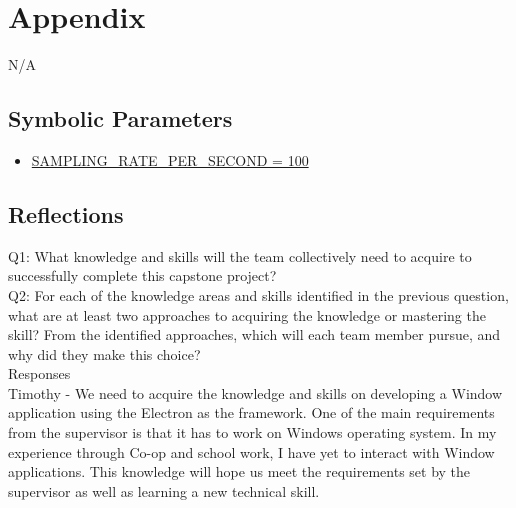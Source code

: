 \documentclass[12pt, titlepage]{article}
\begin{document}




\newpage

\section{Appendix}

N/A

\subsection{Symbolic Parameters}

\begin{itemize}
    \color{red}
    \item \hyperref[sec:sampling]{SAMPLING\_RATE\_PER\_SECOND = 100}
\end{itemize}

\subsection{Reflections}

\noindent Q1: What knowledge and skills will the team collectively need to acquire to successfully complete this capstone project? \\
\noindent Q2: For each of the knowledge areas and skills identified in the previous question, what are at least two approaches to acquiring the knowledge or mastering the skill? 
From the identified approaches, which will each team member pursue, and why did they make this choice?\\

\noindent Responses\\


Timothy - We need to acquire the knowledge and skills on developing a Window application using the Electron as the framework. One of the main requirements
from the supervisor is that it has to work on Windows operating system. In my experience through Co-op and school work, I have 
yet to interact with Window applications. This knowledge will hope us meet the requirements set by the supervisor as well 
as learning a new technical skill. 
\end{document}
